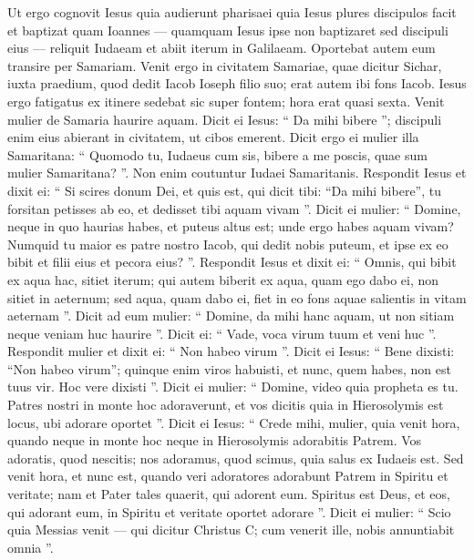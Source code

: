 \begin{biblechapter}
\begin{biblechapter}
\begin{biblechapter}
\begin{biblechapter}
\verse Ut ergo cognovit Iesus quia audierunt pharisaei quia Iesus plures discipulos facit et baptizat quam Ioannes 
\verse — quamquam Iesus ipse non baptizaret sed discipuli eius — 
 \verse reliquit Iudaeam et abiit iterum in Galilaeam. 
\verse Oportebat autem eum transire per Samariam. 
\verse Venit ergo in civitatem Samariae, quae dicitur Sichar, iuxta praedium, quod dedit Iacob Ioseph filio suo; 
\verse erat autem ibi fons Iacob. Iesus ergo fatigatus ex itinere sedebat sic super fontem; hora erat quasi sexta. 
\verse Venit mulier de Samaria haurire aquam. Dicit ei Iesus: “ Da mihi bibere ”; 
\verse discipuli enim eius abierant in civitatem, ut cibos emerent. 
\verse Dicit ergo ei mulier illa Samaritana: “ Quomodo tu, Iudaeus cum sis, bibere a me poscis, quae sum mulier Samaritana? ”. Non enim coutuntur Iudaei Samaritanis. 
\verse Respondit Iesus et dixit ei: “ Si scires donum Dei, et quis est, qui dicit tibi: “Da mihi bibere”, tu forsitan petisses ab eo, et dedisset tibi aquam vivam ”.
 \verse Dicit ei mulier: “ Domine, neque in quo haurias habes, et puteus altus est; unde ergo habes aquam vivam? 
\verse Numquid tu maior es patre nostro Iacob, qui dedit nobis puteum, et ipse ex eo bibit et filii eius et pecora eius? ”. 
\verse Respondit Iesus et dixit ei: “ Omnis, qui bibit ex aqua hac, sitiet iterum; 
 \verse qui autem biberit ex aqua, quam ego dabo ei, non sitiet in aeternum; sed aqua, quam dabo ei, fiet in eo fons aquae salientis in vitam aeternam ”. 
\verse Dicit ad eum mulier: “ Domine, da mihi hanc aquam, ut non sitiam neque veniam huc haurire ”. 
\verse Dicit ei: “ Vade, voca virum tuum et veni huc ”. 
\verse Respondit mulier et dixit ei: “ Non habeo virum ”. Dicit ei Iesus: “ Bene dixisti: “Non habeo virum”; 
\verse quinque enim viros habuisti, et nunc, quem habes, non est tuus vir. Hoc vere dixisti ”.
 \verse Dicit ei mulier: “ Domine, video quia propheta es tu. 
\verse Patres nostri in monte hoc adoraverunt, et vos dicitis quia in Hierosolymis est locus, ubi adorare oportet ”. 
\verse Dicit ei Iesus: “ Crede mihi, mulier, quia venit hora, quando neque in monte hoc neque in Hierosolymis adorabitis Patrem. 
\verse Vos adoratis, quod nescitis; nos adoramus, quod scimus, quia salus ex Iudaeis est. 
\verse Sed venit hora, et nunc est, quando veri adoratores adorabunt Patrem in Spiritu et veritate; nam et Pater tales quaerit, qui adorent eum. 
\verse Spiritus est Deus, et eos, qui adorant eum, in Spiritu et veritate oportet adorare ”. 
\verse Dicit ei mulier: “ Scio quia Messias venit — qui dicitur Christus C; cum venerit ille, nobis annuntiabit omnia ”. 

\end{biblechapter}
\end{biblechapter}
\end{biblechapter}
\end{biblechapter}
